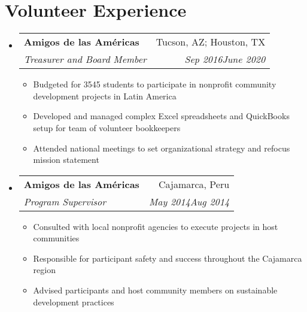 \documentclass[a4paper,20pt]{article}
\makeatletter
\newcommand{\resumeSubheading}[4]{
  \vspace{-1pt}\item
    \begin{tabular*}{0.97\textwidth}{l@{\extracolsep{\fill}}r}
      \textbf{#1} & #2 \\
      \textit{#3} & \textit{#4} \\
    \end{tabular*}\vspace{-5pt}
}
\newcommand{\resumeSubHeadingListStart}{\begin{itemize}[leftmargin=*]}
\newcommand{\resumeSubHeadingListEnd}{\end{itemize}}
\newcommand{\resumeItemListStart}{\begin{itemize}}
\newcommand{\resumeItemListEnd}{\end{itemize}\vspace{-5pt}}
\makeatother
\begin{document}
\section{Volunteer Experience}
  \resumeSubHeadingListStart
  \resumeSubheading
		{Amigos de las Am\'{e}ricas}{Tucson, AZ; Houston, TX}
		{Treasurer and Board Member}{Sep 2016{\textendash}June 2020}
		\resumeItemListStart
        \item 
          {Budgeted for 35{\textendash}45 students to participate in nonprofit community development projects in Latin America}
        \item
          {Developed and managed complex Excel spreadsheets and QuickBooks setup for team of volunteer bookkeepers}
        \item {Attended national meetings to set organizational strategy and refocus mission statement}
		\resumeItemListEnd
\vspace{5pt}
\resumeSubheading
		{Amigos de las Am\'{e}ricas}{Cajamarca, Peru}
		{Program Supervisor}{May 2014{\textendash}Aug 2014}
		\resumeItemListStart
        \item 
          {Consulted with local nonprofit agencies to execute projects in host communities}
        \item
          {Responsible for participant safety and success throughout the Cajamarca region}
        \item {Advised participants and host community members on sustainable development practices}
		\resumeItemListEnd
\resumeSubHeadingListEnd
\end{document}
